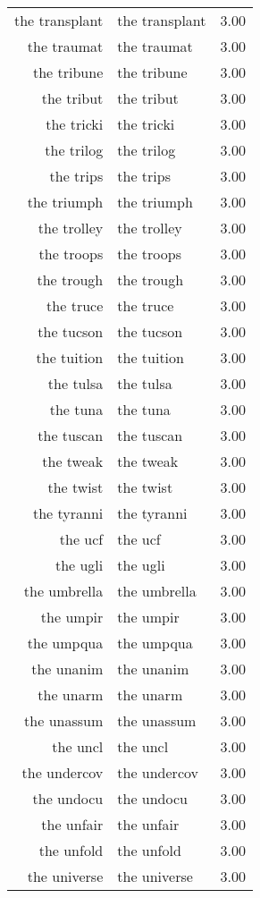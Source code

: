 \begin{table}[ht]
\begin{tabular}{rlr}
  the transplant & the transplant & 3.00 \\ 
  the traumat & the traumat & 3.00 \\ 
  the tribune & the tribune & 3.00 \\ 
  the tribut & the tribut & 3.00 \\ 
  the tricki & the tricki & 3.00 \\ 
  the trilog & the trilog & 3.00 \\ 
  the trips & the trips & 3.00 \\ 
  the triumph & the triumph & 3.00 \\ 
  the trolley & the trolley & 3.00 \\ 
  the troops & the troops & 3.00 \\ 
  the trough & the trough & 3.00 \\ 
  the truce & the truce & 3.00 \\ 
  the tucson & the tucson & 3.00 \\ 
  the tuition & the tuition & 3.00 \\ 
  the tulsa & the tulsa & 3.00 \\ 
  the tuna & the tuna & 3.00 \\ 
  the tuscan & the tuscan & 3.00 \\ 
  the tweak & the tweak & 3.00 \\ 
  the twist & the twist & 3.00 \\ 
  the tyranni & the tyranni & 3.00 \\ 
  the ucf & the ucf & 3.00 \\ 
  the ugli & the ugli & 3.00 \\ 
  the umbrella & the umbrella & 3.00 \\ 
  the umpir & the umpir & 3.00 \\ 
  the umpqua & the umpqua & 3.00 \\ 
  the unanim & the unanim & 3.00 \\ 
  the unarm & the unarm & 3.00 \\ 
  the unassum & the unassum & 3.00 \\ 
  the uncl & the uncl & 3.00 \\ 
  the undercov & the undercov & 3.00 \\ 
  the undocu & the undocu & 3.00 \\ 
  the unfair & the unfair & 3.00 \\ 
  the unfold & the unfold & 3.00 \\ 
  the universe & the universe & 3.00 \\ 

\end{tabular}
\end{table}
